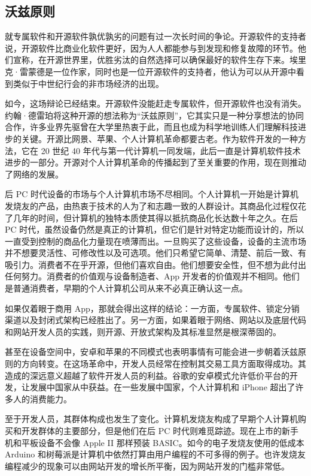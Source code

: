 \documentclass[12pt,UTF8]{ctexbook}
\begin{document}
\subsection{沃兹原则}


就专属软件和开源软件孰优孰劣的问题有过一次长时间的争论。开源软件的支持者说，开源软件比商业化软件更好，因为人人都能参与到发现和修复故障的环节。他们宣称，在开源世界里，优胜劣汰的自然选择可以确保最好的软件生存下来。埃里克·雷蒙德是一位作家，同时也是一位开源软件的支持者，他认为可以从开源中看到类似于中世纪行会的非市场经济的出现。

如今，这场辩论已经结束。开源软件没能赶走专属软件，但开源软件也没有消失。约翰·德雷珀将这种开源的想法称为“沃兹原则”，它其实只是一种分享想法的协同合作，许多业界先驱曾在大学里热衷于此，而且也成为科学地训练人们理解科技进步的关键。开源比网景、苹果、个人计算机革命都要古老。作为软件开发的一种方法，它在 20 世纪 40 年代与第一代计算机一同发端，此后一直是计算机软件技术进步的一部分。开源对个人计算机革命的传播起到了至关重要的作用，现在则推动了网络的发展。

后 PC 时代设备的市场与个人计算机市场不尽相同。个人计算机一开始是计算机发烧友的产品，由热衷于技术的人为了和志趣一致的人群设计。其商品化过程仅花了几年的时间，但计算机的独特本质使其得以抵抗商品化长达数十年之久。在后 PC 时代，虽然设备仍然是真正的计算机，但它们是针对特定功能而设计的，所以一直受到控制的商品化力量现在喷薄而出。一旦购买了这些设备，设备的主流市场并不想要灵活性、可修改性以及可选项。他们只希望它简单、清楚、前后一致、有吸引力。消费者不在乎开源，但他们喜欢自由。他们想要安全性，但不想为此付出任何努力。消费者的价值观与设备制造者、App 开发者的价值观并不相同。他们是普通消费者，早期的个人计算机公司从来不必真正确认这一点。

如果仅着眼于商用 App，那就会得出这样的结论：一方面，专属软件、锁定分销渠道以及封闭式架构已经胜出了。另一方面，如果着眼于网络、网站以及底层代码和网站开发人员的实践，则开源、开放式架构及其标准显然是根深蒂固的。

甚至在设备空间中，安卓和苹果的不同模式也表明事情有可能会进一步朝着沃兹原则的方向转变。在这场革命中，开发人员经常在控制其交易工具方面取得成功。其造成的深远意义超越了软件开发人员的利益。谷歌的安卓模式允许低价平台的开发，让发展中国家从中获益。在一些发展中国家，个人计算机和 iPhone 超出了许多人的消费能力。

至于开发人员，其群体构成也发生了变化。计算机发烧友构成了早期个人计算机购买和开发群体的主要部分，但是他们在后 PC 时代则难觅踪迹。现在上市的新手机和平板设备不会像 Apple II 那样预装 BASIC。如今的电子发烧友使用的低成本 Arduino 和树莓派是计算机中依然打算由用户编程的不可多得的例子。也许发烧友编程减少的现象可以由网站开发的增长所平衡，因为网站开发的门槛非常低。
\end{document}
